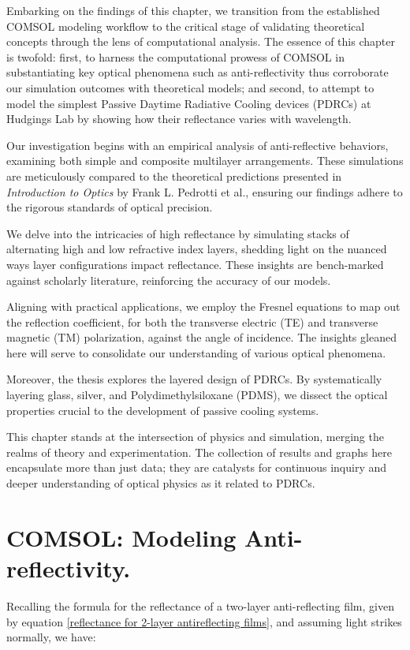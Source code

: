 Embarking on the findings of this chapter, we transition from the established COMSOL modeling workflow to the critical stage of validating theoretical concepts through the lens of computational analysis. The essence of this chapter is twofold: first, to harness the computational prowess of COMSOL in substantiating key optical phenomena such as anti-reflectivity thus corroborate our simulation outcomes with theoretical models; and second, to attempt to model the simplest Passive Daytime Radiative Cooling devices (PDRCs) at Hudgings Lab by showing how their reflectance varies with wavelength.

Our investigation begins with an empirical analysis of anti-reflective behaviors, examining both simple and composite multilayer arrangements. These simulations are meticulously compared to the theoretical predictions presented in \emph{Introduction to Optics} by Frank L. Pedrotti et al., ensuring our findings adhere to the rigorous standards of optical precision.

We delve into the intricacies of high reflectance by simulating stacks of alternating high and low refractive index layers, shedding light on the nuanced ways layer configurations impact reflectance. These insights are bench-marked against scholarly literature, reinforcing the accuracy of our models.

Aligning with practical applications, we employ the Fresnel equations to map out the reflection coefficient, for both the transverse electric (TE) and transverse magnetic (TM) polarization, against the angle of incidence. The insights gleaned here will serve to consolidate our understanding of various optical phenomena.

Moreover, the thesis explores the layered design of PDRCs. By systematically layering glass, silver, and Polydimethylsiloxane (PDMS), we dissect the optical properties crucial to the development of passive cooling systems.

This chapter stands at the intersection of physics and simulation, merging the realms of theory and experimentation. The collection of results and graphs here encapsulate more than just data; they are catalysts for continuous inquiry and deeper understanding of optical physics as it related to PDRCs.

\section{COMSOL: Modeling Anti-reflectivity.}
Recalling the formula for the reflectance of a two-layer anti-reflecting film, given by equation \ref{reflectance for 2-layer antireflecting films}, and assuming light strikes normally, we have:

